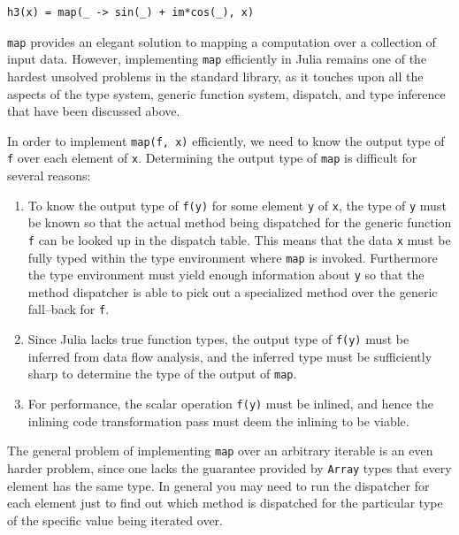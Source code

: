 \documentclass[pldi]{sigplanconf-pldi15}
\begin{document}
\begin{lstlisting}
h3(x) = map(_ -> sin(_) + im*cos(_), x)
\end{lstlisting}

\verb|map| provides an elegant solution to mapping a computation over a
collection of input data. However, implementing \verb|map| efficiently in Julia
remains one of the hardest unsolved problems in the standard library, as it
touches upon all the aspects of the type system, generic function system,
dispatch, and type inference that have been discussed above.

In order to implement \verb|map(f, x)| efficiently, we need to know the output
type of \verb|f| over each element of \verb|x|. Determining the output type of
\verb|map| is difficult for several reasons:

\begin{enumerate}

	\item To know the output type of \verb|f(y)| for some element \verb|y|
	of \verb|x|, the type of \verb|y| must be known so that the actual
	method being dispatched for the generic function \verb|f| can be looked
	up in the dispatch table. This means that the data \verb|x| must be
	fully typed within the type environment where \verb|map| is invoked.
	Furthermore the type environment must yield enough information about
	\verb|y| so that the method dispatcher is able to pick out a
	specialized method over the generic fall--back for \verb|f|.

	\item Since Julia lacks true function types, the output type of
	\verb|f(y)| must be inferred from data flow analysis, and the inferred
	type must be sufficiently sharp to determine the type of the output of
	\verb|map|.

	\item For performance, the scalar operation \verb|f(y)| must be
	inlined, and hence the inlining code transformation pass must deem the
	inlining to be viable.

\end{enumerate}

The general problem of implementing \verb|map| over an arbitrary iterable is an
even harder problem, since one lacks the guarantee provided by \verb|Array|
types that every element has the same type.  In general you may need to run the
dispatcher for each element just to find out which method is dispatched for the
particular type of the specific value being iterated over.
\end{document}
